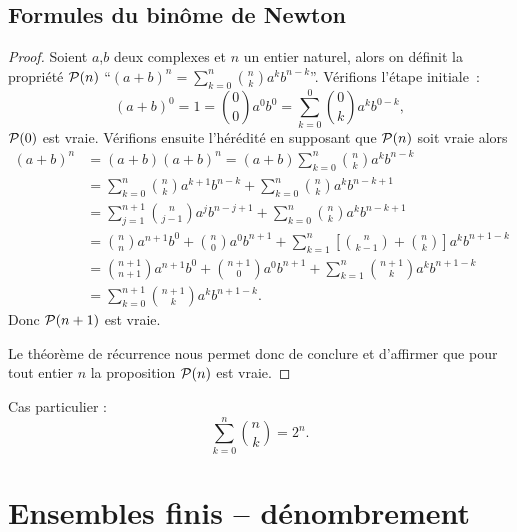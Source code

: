 \subsection{Formules du binôme de Newton}

\begin{proof}
  Soient \(a\),\(b\) deux complexes et \(n\) un entier naturel, alors on définit la propriété \(\P(n)\) ``\((a+b)^n=\sum_{k=0}^n \binom{n}{k}a^kb^{n-k}\)''. Vérifions l'étape initiale~:
\begin{equation}
  (a+b)^0=1=\binom{0}{0}a^0b^0=\sum_{k=0}^0 \binom{0}{k}a^kb^{0-k},
\end{equation}
\(\P(0)\) est vraie. Vérifions ensuite l'hérédité en supposant que \(\P(n)\) soit vraie alors
\begin{align}
  (a+b)^n&=(a+b)(a+b)^n=(a+b)\sum_{k=0}^n \binom{n}{k}a^kb^{n-k}\\
  &=\sum_{k=0}^n \binom{n}{k}a^{k+1}b^{n-k}+\sum_{k=0}^n \binom{n}{k}a^kb^{n-k+1}\\
  &=\sum_{j=1}^{n+1} \binom{n}{j-1}a^{j}b^{n-j+1}+\sum_{k=0}^n \binom{n}{k}a^kb^{n-k+1}\\
  &=\binom{n}{n}a^{n+1}b^0 +\binom{n}{0}a^0b^{n+1} + \sum_{k=1}^{n}\left[\binom{n}{k-1}+\binom{n}{k}\right]a^kb^{n+1-k}\\
  &=\binom{n+1}{n+1}a^{n+1}b^0+\binom{n+1}{0}a^0b^{n+1}+ \sum_{k=1}^{n}\binom{n+1}{k}a^kb^{n+1-k}\\
  &=\sum_{k=0}^{n+1}\binom{n+1}{k}a^kb^{n+1-k}.
\end{align}
Donc \(\P(n+1)\) est vraie.

Le théorème de récurrence nous permet donc de conclure et d'affirmer que pour tout entier \(n\) la proposition \(\P(n)\) est vraie.
\end{proof}
Cas particulier :
\begin{equation}
  \sum_{k=0}^n \binom{n}{k}=2^n.
\end{equation}

\section{Ensembles finis -- dénombrement}


